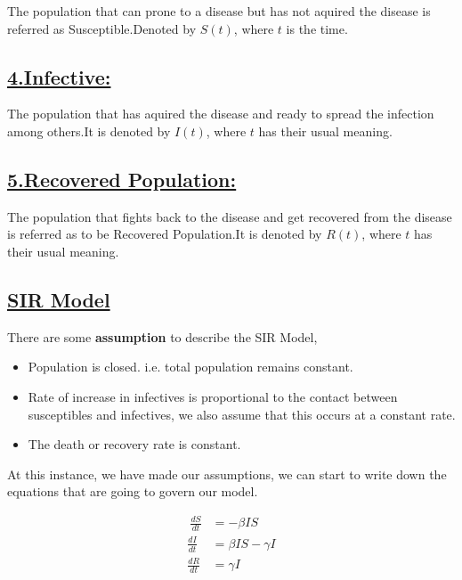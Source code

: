 \documentclass[12pt,a4paper]{article}
\begin{document}
    The population that can prone to a disease but has not aquired the disease is referred as Susceptible.Denoted by $S(t)$, where $t$ is the time.


    \subsection*{\underline{4.Infective:}}

    The population that has aquired the disease and ready to spread the infection among others.It is denoted by $I(t)$, where $t$ has their usual meaning.

    \subsection*{\underline{5.Recovered Population:}}

    The population that fights back to the disease and get recovered from the disease is referred as to be Recovered Population.It is denoted by $R(t)$, where $t$ has their usual meaning. 

    \pagebreak

    \vspace*{0.5cm}

    \begin{center}
        \section*{\underline{\Large{{\bf SIR Model}}}}
    \end{center}

    There are some {\bf assumption} to describe the SIR Model,
    \begin{itemize}
        \item Population is closed. i.e. total population remains constant.
        \item Rate of increase in infectives is proportional to the contact between susceptibles and infectives, we also assume that this occurs at a constant rate.
        \item The death or recovery rate is constant.
    \end{itemize}

    At this instance, we have made our assumptions, we can start to write down the equations that are going to govern our model.

   

    \begin{center}
        \begin{equation*}
            \begin{split}\
                \frac{dS}{dt} & = -\beta IS\\[2mm]
                \frac{dI}{dt} & = \beta IS - \gamma I\\[2mm]
                \frac{dR}{dt} & = \gamma I
            \end{split}
        \end{equation*}
    \end{center}
\end{document}
